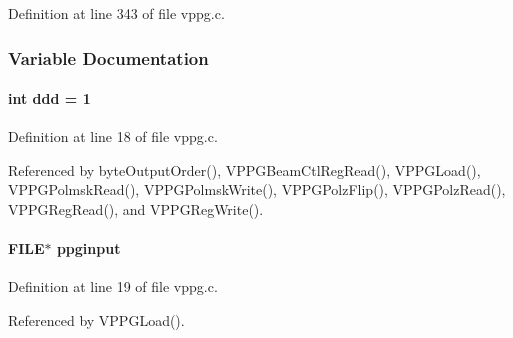 Definition at line 343 of file vppg.c.

\subsubsection{Variable Documentation}
\paragraph[{ddd}]{\setlength{\rightskip}{0pt plus 5cm}int {\bf ddd} = 1}\hfill\label{vppg_8c_aef52aa4bdd3ca41e213a3ff7966de133}


Definition at line 18 of file vppg.c.

Referenced by byteOutputOrder(), VPPGBeamCtlRegRead(), VPPGLoad(), VPPGPolmskRead(), VPPGPolmskWrite(), VPPGPolzFlip(), VPPGPolzRead(), VPPGRegRead(), and VPPGRegWrite().
\paragraph[{ppginput}]{\setlength{\rightskip}{0pt plus 5cm}FILE$\ast$ {\bf ppginput}}\hfill\label{vppg_8c_abd2688837180f75a7c1ba4c5f342c47b}


Definition at line 19 of file vppg.c.

Referenced by VPPGLoad().